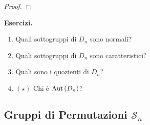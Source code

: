 \begin{multicols}{2}
\begin{proof}
\end{proof}

\textbf{Esercizi.}
\begin{enumerate}
	\item Quali sottogruppi di $ D_n $ sono normali?
	\item Quali sottogruppi di $ D_n $ sono caratteristici?
	\item Quali sono i quozienti di $ D_n $?
	\item $ (\star) $ Chi è $ \mathrm{Aut}\left( D_n \right) $?
\end{enumerate}

\end{multicols}

\subsection{Gruppi di Permutazioni $ \mathcal{S}_n $}
